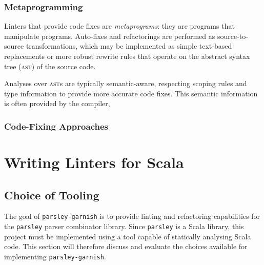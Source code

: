 \documentclass[../../main.tex]{subfiles}
\begin{document}

\subsubsection{Metaprogramming}
Linters that provide code fixes are \emph{metaprograms}: they are programs that manipulate programs.
Auto-fixes and refactorings are performed as source-to-source transformations, which may be implemented as simple text-based replacements or more robust rewrite rules that operate on the abstract syntax tree (\textsc{ast}) of the source code.

Analyses over \textsc{ast}s are typically semantic-aware, respecting scoping rules and type information to provide more accurate code fixes.
This semantic information is often provided by the compiler, 

\subsubsection{Code-Fixing Approaches}



\section{Writing Linters for Scala}


\subsection{Choice of Tooling}
The goal of \texttt{parsley-garnish} is to provide linting and refactoring capabilities for the \texttt{parsley} parser combinator library.
Since \texttt{parsley} is a Scala library, this project must be implemented using a tool capable of statically analysing Scala code.
This section will therefore discuss and evaluate the choices available for implementing \texttt{parsley-garnish}.
\end{document}
